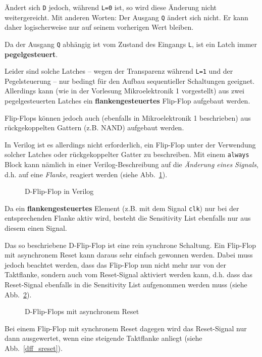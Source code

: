 \"{A}ndert sich \texttt{D} jedoch,
w\"{a}hrend \texttt{L=0} ist, so wird diese \"{A}nderung nicht
weitergereicht. Mit anderen Worten: Der Ausgang \texttt{Q} \"{a}ndert sich
nicht. Er kann daher logischerweise nur auf seinem vorherigen Wert
bleiben.

Da der Ausgang \texttt{Q} abh\"{a}ngig ist vom Zustand des Eingangs \texttt{L}, ist ein
Latch immer \textbf{pegelgesteuert}.


Leider sind solche Latches -- wegen der Transparenz w\"{a}hrend
\texttt{L=1} und der Pegelsteuerung -- nur bedingt f\"{u}r den Aufbau
sequentieller Schaltungen geeignet. Allerdings kann (wie in der
Vorlesung Mikroelektronik 1 vorgestellt) aus zwei
pegelgesteuerten Latches ein \textbf{flankengesteuertes}
Flip-Flop aufgebaut werden.

Flip-Flops k\"{o}nnen jedoch auch (ebenfalls in Mikroelektronik 1
beschrieben) aus r\"{u}ckgekoppelten Gattern (z.B. NAND) aufgebaut
werden.

In Verilog ist es allerdings nicht erforderlich, ein Flip-Flop unter
der Verwendung solcher Latches oder r\"{u}ckgekoppelter Gatter zu
beschreiben. Mit einem \texttt{always} Block kann n\"{a}mlich
in einer Verilog-Beschreibung auf die \emph{\"{A}nderung eines
	Signals}, d.h. auf eine \emph{Flanke}, reagiert werden (siehe Abb.~\ref{dff}).
\begin{figure}[H]
	\lstset{style=verilog-style}
	
	\caption{D-Flip-Flop in Verilog}
	\label{dff}
\end{figure}

Da ein \textbf{flankengesteuertes} Element (z.B. mit dem Signal
\texttt{clk}) nur bei der entsprechenden Flanke aktiv wird,
besteht die Sensitivity List ebenfalls nur aus diesem einen Signal.

Das so beschriebene D-Flip-Flop ist eine rein synchrone Schaltung.
Ein Flip-Flop mit asynchronem Reset kann daraus sehr einfach
gewonnen werden. Dabei muss jedoch beachtet werden, dass das
Flip-Flop nun nicht mehr nur von der Taktflanke, sondern auch vom
Reset-Signal aktiviert werden kann, d.h. dass das Reset-Signal
ebenfalls in die Sensitivity List aufgenommen werden muss (siehe Abb.~\ref{dff_asreset}).
\begin{figure}[H]
	\lstset{style=verilog-style}
	
	\caption{D-Flip-Flops mit asynchronem Reset}
	\label{dff_asreset}
\end{figure}
Bei einem Flip-Flop mit synchronem Reset dagegen wird das
Reset-Signal nur dann ausgewertet, wenn eine steigende
Taktflanke anliegt (siehe Abb.~\ref{dff_sreset}).

